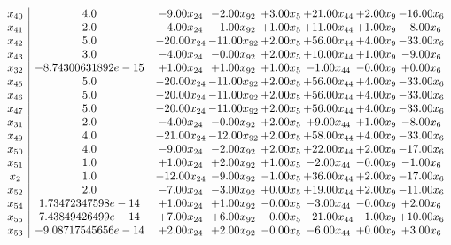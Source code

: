\documentclass[8pt]{article}
\begin{document}
\[\begin{array}{c| c c@{\hskip 2pt} c@{\hskip 2pt} c@{\hskip 2pt} c@{\hskip 2pt} c@{\hskip 2pt} c@{\hskip 2pt} }
 x_{40}   &  4.0 & -9.00 x_{24} & -2.00 x_{92} & +  3.00 x_{5} & + 21.00 x_{44} & +  2.00 x_{9} & -16.00 x_{6}\\
 x_{41}   &  2.0 & -4.00 x_{24} & -1.00 x_{92} & +  1.00 x_{5} & + 11.00 x_{44} & +  1.00 x_{9} & -8.00 x_{6}\\
 x_{42}   &  5.0 & -20.00 x_{24} & -11.00 x_{92} & +  2.00 x_{5} & + 56.00 x_{44} & +  4.00 x_{9} & -33.00 x_{6}\\
 x_{43}   &  3.0 & -4.00 x_{24} & -0.00 x_{92} & +  2.00 x_{5} & + 10.00 x_{44} & +  1.00 x_{9} & -9.00 x_{6}\\
 x_{32}   &  -8.74300631892e-15 & +  1.00 x_{24} & +  1.00 x_{92} & +  1.00 x_{5} & -1.00 x_{44} & -0.00 x_{9} & +  0.00 x_{6}\\
 x_{45}   &  5.0 & -20.00 x_{24} & -11.00 x_{92} & +  2.00 x_{5} & + 56.00 x_{44} & +  4.00 x_{9} & -33.00 x_{6}\\
 x_{46}   &  5.0 & -20.00 x_{24} & -11.00 x_{92} & +  2.00 x_{5} & + 56.00 x_{44} & +  4.00 x_{9} & -33.00 x_{6}\\
 x_{47}   &  5.0 & -20.00 x_{24} & -11.00 x_{92} & +  2.00 x_{5} & + 56.00 x_{44} & +  4.00 x_{9} & -33.00 x_{6}\\
 x_{31}   &  2.0 & -4.00 x_{24} & -0.00 x_{92} & +  2.00 x_{5} & +  9.00 x_{44} & +  1.00 x_{9} & -8.00 x_{6}\\
 x_{49}   &  4.0 & -21.00 x_{24} & -12.00 x_{92} & +  2.00 x_{5} & + 58.00 x_{44} & +  4.00 x_{9} & -33.00 x_{6}\\
 x_{50}   &  4.0 & -9.00 x_{24} & -2.00 x_{92} & +  2.00 x_{5} & + 22.00 x_{44} & +  2.00 x_{9} & -17.00 x_{6}\\
 x_{51}   &  1.0 & +  1.00 x_{24} & +  2.00 x_{92} & +  1.00 x_{5} & -2.00 x_{44} & -0.00 x_{9} & -1.00 x_{6}\\
 x_{2}   &  1.0 & -12.00 x_{24} & -9.00 x_{92} & -1.00 x_{5} & + 36.00 x_{44} & +  2.00 x_{9} & -17.00 x_{6}\\
 x_{52}   &  2.0 & -7.00 x_{24} & -3.00 x_{92} & +  0.00 x_{5} & + 19.00 x_{44} & +  2.00 x_{9} & -11.00 x_{6}\\
 x_{54}   &  1.73472347598e-14 & +  1.00 x_{24} & +  1.00 x_{92} & -0.00 x_{5} & -3.00 x_{44} & -0.00 x_{9} & +  2.00 x_{6}\\
 x_{55}   &  7.43849426499e-14 & +  7.00 x_{24} & +  6.00 x_{92} & -0.00 x_{5} & -21.00 x_{44} & -1.00 x_{9} & + 10.00 x_{6}\\
 x_{53}   &  -9.08717545656e-14 & +  2.00 x_{24} & +  2.00 x_{92} & -0.00 x_{5} & -6.00 x_{44} & +  0.00 x_{9} & +  3.00 x_{6}\\

\end{array}\]
\end{document}
